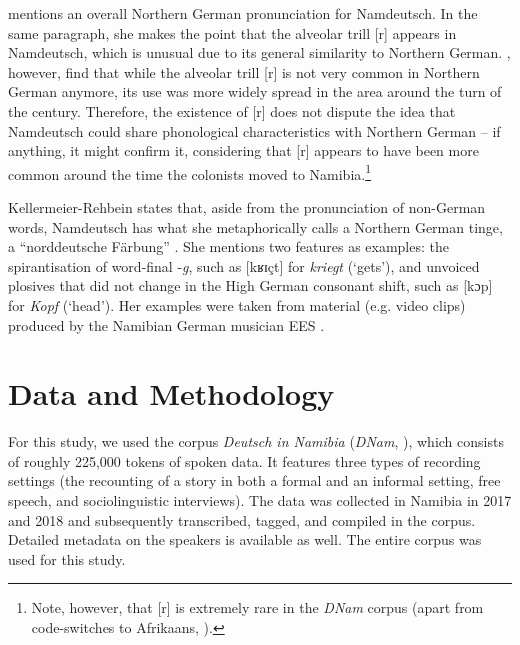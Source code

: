 \documentclass[output=paper]{langsci/langscibook}
\begin{document}
\citet[114]{riehl_sprachkontaktforschung_2004} mentions an overall Northern German pronunciation for Namdeutsch. In the same paragraph, she makes the point that the alveolar trill [r] appears in Namdeutsch, which is unusual due to its general similarity to Northern German. \citet[301]{elmentaler_norddeutscher_2015}, however, find that while the alveolar trill [r] is not very common in Northern German anymore, its use was more widely spread in the area around the turn of the century. Therefore, the existence of [r] does not dispute the idea that Namdeutsch could share phonological characteristics with Northern German – if anything, it might confirm it, considering that [r] appears to have been more common around the time the colonists moved to Namibia.\footnote{Note, however, that [r] is extremely rare in the \textit{DNam} corpus (apart from code-switches to Afrikaans, \citealt{zimmer_sprachliche_nodate}).}

Kellermeier-Rehbein states that, aside from the pronunciation of non-German words, Namdeutsch has what she metaphorically calls a Northern German tinge, a “norddeutsche Färbung” \citep[49]{kellermeier-rehbein_namslang_2015}. She mentions two features as examples: the spirantisation of word-final \nobreakdash-\textit{g}, such as [kʁɪçt] for \textit{kriegt} (‘gets’), and unvoiced plosives that did not change in the High German consonant shift, such as [kɔp] for \textit{Kopf} (‘head’). Her examples were taken from material (e.g. video clips) produced by the Namibian German musician EES \citep[48]{kellermeier-rehbein_namslang_2015}.

\section{Data and Methodology}
\label{sec:stuhl:3}

For this study, we used the corpus \textit{Deutsch in Namibia} (\textit{DNam}, \citealt{zimmer_korpus_2020}), which consists of roughly 225,000 tokens of spoken data. It features three types of recording settings (the recounting of a story in both a formal and an informal setting, free speech, and sociolinguistic interviews). The data was collected in Namibia in 2017 and 2018 and subsequently transcribed, tagged, and compiled in the corpus. Detailed metadata on the speakers is available as well. The entire corpus was used for this study. 
\end{document}
